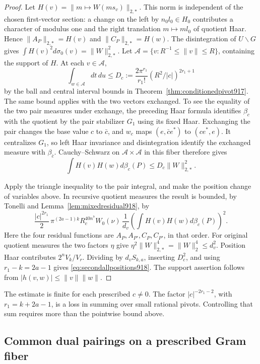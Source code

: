 \documentclass[a4paper,11pt]{article}
\theoremstyle{definition}
\theoremstyle{remark}
\numberwithin{equation}{section}
\begin{document}
\begin{proof}
Let \(H(v)=\|m\mapsto W(m s_v)\|_{2,*}\). This norm is
independent of the chosen first-vector section: a change on
the left by \(n_0 l_0\in H_0\) contributes a character of
modulus one and the right translation \(m\mapsto m l_0\)
of quotient Haar. Hence \(\|A_P\|_{2,*}=H(v)\) and
\(\|C_P\|_{2,*}=H(w)\).
The disintegration of \(U\backslash G\) gives
\(\int H(v)^2d\sigma_0(v)=\|W\|_{2,*}^2\).
Let \(\mathcal A=\{v:R^{-1}\le\|v\|\le R\}\), containing
the support of \(H\). At each \(v\in\mathcal A\),
\[
 \int_{w\in\mathcal A}dt\,du\le
  D_c:=\frac{2\pi^{r_1}}{r_1!}
                  (R^2/|c|)^{2r_1+1}
\]
by the ball and central interval bounds in
Theorem~\ref{thm:conditionedpivot917}. The same bound applies
with the two vectors exchanged. To see the equality of the
two pair measures under exchange, the preceding Haar formula
identifies \(\beta_c\) with the quotient by the pair stabilizer
\(G_1\) using its fixed Haar. Exchanging the pair changes the
base value \(c\) to \(\bar c\), and \(w_c\) maps
\((e,\bar c e^*)\) to \((c e^*,e)\). It centralizes
\(G_1\), so left Haar invariance and disintegration identify
the exchanged measure with \(\beta_{\bar c}\).
Cauchy--Schwarz on \(\mathcal A\times\mathcal A\) in this
fiber therefore gives
\[
         \int H(v)H(w)d\beta_c(P)\le D_c\|W\|_{2,*}^2 .
\]

Apply the triangle inequality to the pair integral, and
make the position change of variables above. In recursive
quotient measures the result is bounded, by Tonelli and
Lemma~\ref{lem:mixedresidual918}, by
\[
 \frac{|c|^{2r_1}}{2}
 \,\pi^{(2a-1)k} R_c^{40n^7} W_0(\nu)
 \,\frac1{d_v}
     \left(\int H(v)H(w)d\beta_c(P)\right)^2.
\]
Here the four residual functions are
\(A_P,A_{P'},C_P,C_{P'}\), in that order. For original
quotient measures the two factors \(\eta\) give
\(\eta^2\|W\|_{2,*}^4=\|W\|_2^4\le d_v^2\).
Position Haar contributes \(2^n V_k/V_r\). Dividing by
\(d_v S_{k,a}\), inserting \(D_c^2\), and using
\(r_1-k=2a-1\) gives \eqref{eq:secondallpositions918}.
The support assertion follows from
\(|h(v,w)|\le\|v\|\|w\|\).
\end{proof}

The estimate is finite for each prescribed \(c\ne0\).
The factor \(|c|^{-2r_1-2}\), with \(r_1=k+2a-1\), is a loss
in summing over small rational pivots. Controlling that sum
requires more than the pointwise bound above.
\clearpage

\subsection{Common dual pairings on a prescribed Gram fiber}
\label{sec:crossfiber919}
\end{document}
